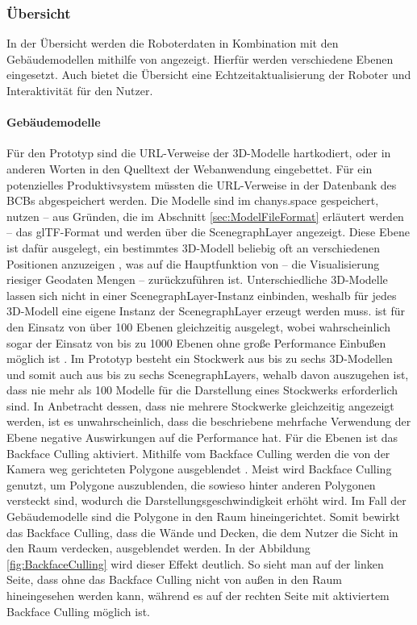 \subsubsection{Übersicht}
In der Übersicht werden die Roboterdaten in Kombination mit den Gebäudemodellen mithilfe von \deckgl{} angezeigt. Hierfür werden verschiedene Ebenen eingesetzt. Auch bietet die Übersicht eine Echtzeitaktualisierung der Roboter und Interaktivität für den Nutzer.

\paragraph{Gebäudemodelle}
Für den Prototyp sind die \ac{URL}-Verweise der 3D-Modelle hartkodiert, oder in anderen Worten in den Quelltext der Webanwendung eingebettet. Für ein potenzielles Produktivsystem müssten die \ac{URL}-Verweise in der Datenbank des \ac{BCB}s abgespeichert werden. Die Modelle sind im chanys.space gespeichert, nutzen – aus Gründen, die im Abschnitt \ref{sec:ModelFileFormat} erläutert werden – das \ac{glTF}-Format und werden über die ScenegraphLayer angezeigt. Diese Ebene ist dafür ausgelegt, ein bestimmtes 3D-Modell beliebig oft an verschiedenen Positionen anzuzeigen \cite{DeckglScenegraphLayer}, was auf die Hauptfunktion von \deckgl{} – die Visualisierung riesiger Geodaten Mengen \cite[S.~3]{YangWang2019} – zurückzuführen ist. Unterschiedliche 3D-Modelle lassen sich nicht in einer ScenegraphLayer-Instanz einbinden, weshalb für jedes 3D-Modell eine eigene Instanz der ScenegraphLayer erzeugt werden muss. \deckgl{} ist für den Einsatz von über 100 Ebenen gleichzeitig ausgelegt, wobei wahrscheinlich sogar der Einsatz von bis zu 1000 Ebenen ohne große Performance Einbußen möglich ist \cite{DeckglPerformance}. Im Prototyp besteht ein Stockwerk aus bis zu sechs 3D-Modellen und somit auch aus bis zu sechs ScenegraphLayers, wehalb davon auszugehen ist, dass nie mehr als 100 Modelle für die Darstellung eines Stockwerks erforderlich sind. In Anbetracht dessen, dass nie mehrere Stockwerke gleichzeitig angezeigt werden, ist es unwahrscheinlich, dass die beschriebene mehrfache Verwendung der Ebene negative Auswirkungen auf die Performance hat. Für die Ebenen ist das Backface Culling aktiviert. Mithilfe vom Backface Culling werden die von der Kamera weg gerichteten Polygone ausgeblendet \cite{BackfaceCulling}. Meist wird Backface Culling genutzt, um Polygone auszublenden, die sowieso hinter anderen Polygonen versteckt sind, wodurch die Darstellungsgeschwindigkeit erhöht wird. Im Fall der Gebäudemodelle sind die Polygone in den Raum hineingerichtet. Somit bewirkt das Backface Culling, dass die Wände und Decken, die dem Nutzer die Sicht in den Raum verdecken, ausgeblendet werden. In der Abbildung \ref{fig:BackfaceCulling} wird dieser Effekt deutlich. So sieht man auf der linken Seite, dass ohne das Backface Culling nicht von außen in den Raum hineingesehen werden kann, während es auf der rechten Seite mit aktiviertem Backface Culling möglich ist.

